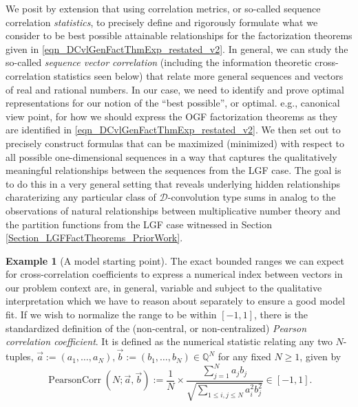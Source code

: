 \documentclass[12pt,reqno,a4letter]{article}
\numberwithin{figure}{section}
\numberwithin{table}{section}
\numberwithin{equation}{section}
\theoremstyle{plain}
\numberwithin{theorem}{section}
\theoremstyle{definition}
\newtheorem{example}[theorem]{Example}
\begin{document}
We posit by extension that using correlation metrics, 
or so-called sequence correlation \emph{statistics}, to precisely define and 
rigorously formulate what we consider to be best possible attainable relationships 
for the factorization theorems given in \eqref{eqn_DCvlGenFactThmExp_restated_v2}. 
In general, we can study the so-called \emph{sequence vector correlation} (including the 
information theoretic cross-correlation statistics seen below) 
that relate more general sequences and vectors of real and rational numbers. 
In our case, we need to identify and prove optimal representations 
for our notion of the ``best possible'', or optimal. e.g., canonical view point, for how we should express 
the OGF factorization theorems as they are identified in 
\eqref{eqn_DCvlGenFactThmExp_restated_v2}. 
We then set out to precisely construct formulas that can be maximized (minimized) with respect to all 
possible one-dimensional sequences in a way that captures the qualitatively meaningful relationships 
between the sequences from the LGF case. 
The goal is to do this in a very general setting that reveals 
underlying hidden relationships charaterizing any particular class of $\mathcal{D}$-convolution type sums in 
analog to the observations of natural relationships between multiplicative number theory and 
the partition functions from the LGF case witnessed in 
Section \ref{Section_LGFFactTheorems_PriorWork}. 

\begin{example}[A model starting point]
The exact bounded ranges we can expect for cross-correlation coefficients to express a numerical index 
between vectors in our problem context are, in general, variable and subject to the qualitative 
interpretation which we have to reason about separately to ensure a good model fit. 
If we wish to normalize the range to be within $[-1, 1]$, there is the standardized 
definition of the 
(non-central, or non-centralized) \emph{Pearson correlation coefficient}. 
It is defined as the numerical statistic relating any two $N$-tuples, 
$\vec{a} := (a_1, \ldots, a_N), \vec{b} := (b_1, \ldots, b_N) \in \mathbb{Q}^N$ for any fixed $N \geq 1$, 
given by 
\[
\operatorname{PearsonCorr}(N; \vec{a}, \vec{b}) := 
     \frac{1}{N} \times \frac{\sum\limits_{j=1}^{N} a_j b_j}{\sqrt{
     \sum\limits_{1 \leq i,j \leq N} a_i^2 b_j^2}} \in [-1, 1]. 
\]
\end{example}
\end{document}
